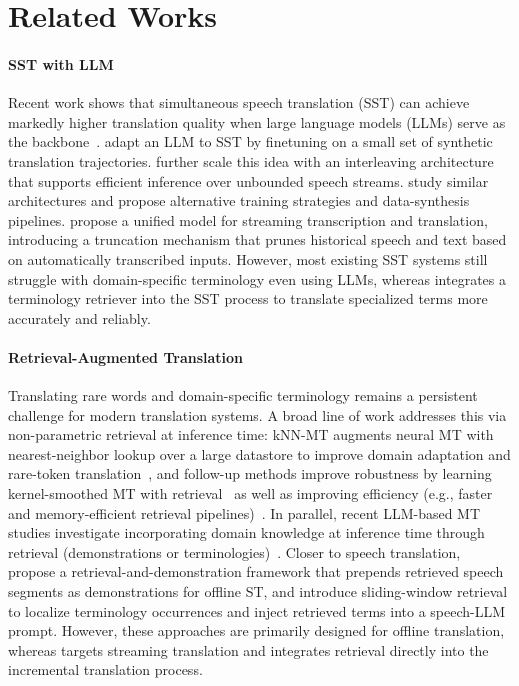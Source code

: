 \section{Related Works}

\paragraph{SST with LLM} Recent work shows that simultaneous speech translation (SST) can achieve markedly higher translation quality when large language models (LLMs) serve as the backbone~\citep{ahmad-etal-2024-findings}. \citet{koshkin-etal-2024-transllama} adapt an LLM to SST by finetuning on a small set of synthetic translation trajectories. \citet{ouyang-etal-2025-infinisst} further scale this idea with an interleaving architecture that supports efficient inference over unbounded speech streams. \citet{fu2025efficientadaptivesimultaneousspeech} study similar architectures and propose alternative training strategies and data-synthesis pipelines. \citet{guo2025streamuniachievingstreamingspeech} propose a unified model for streaming transcription and translation, introducing a truncation mechanism that prunes historical speech and text based on automatically transcribed inputs. 
However, most existing SST systems still struggle with domain-specific terminology even using LLMs, whereas \method integrates a terminology retriever into the SST process to translate specialized terms more accurately and reliably.

\paragraph{Retrieval-Augmented Translation}

Translating rare words and domain-specific terminology remains a persistent challenge for modern translation systems. A broad line of work addresses this via non-parametric retrieval at inference time: kNN-MT augments neural MT with nearest-neighbor lookup over a large datastore to improve domain adaptation and rare-token translation~\citep{khandelwal2021nearest}, and follow-up methods improve robustness by learning kernel-smoothed MT with retrieval~\citep{jiang-etal-2021-learning} as well as improving efficiency (e.g., faster and memory-efficient retrieval pipelines)~\citep{meng-etal-2022-fast,zhu-etal-2023-ink}. In parallel, recent LLM-based MT studies investigate incorporating domain knowledge at inference time through retrieval (demonstrations or terminologies)~\citep{li-etal-2025-leveraging}. Closer to speech translation, \citet{li-etal-2024-optimizing-rare} propose a retrieval-and-demonstration framework that prepends retrieved speech segments as demonstrations for offline ST, and \citet{wu-etal-2025-locate} introduce sliding-window retrieval to localize terminology occurrences and inject retrieved terms into a speech-LLM prompt. However, these approaches are primarily designed for offline translation, whereas \method targets streaming translation and integrates retrieval directly into the incremental translation process.

